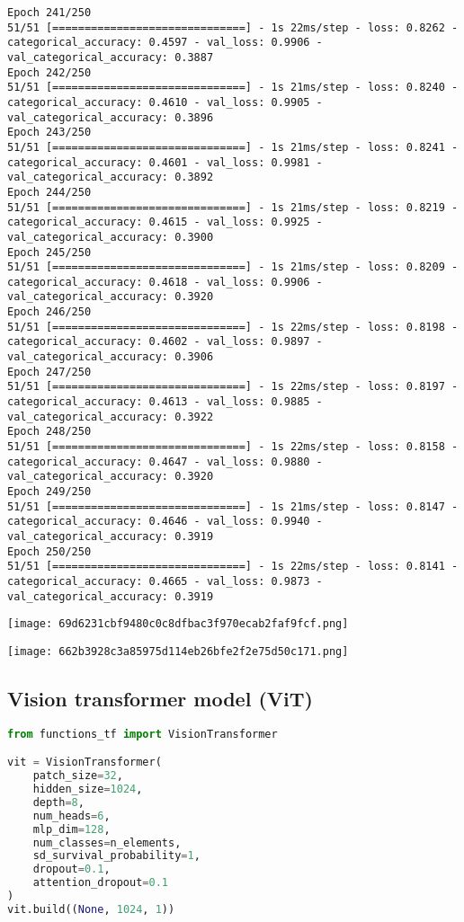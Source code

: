 \begin{lstlisting}
Epoch 241/250
51/51 [==============================] - 1s 22ms/step - loss: 0.8262 - categorical_accuracy: 0.4597 - val_loss: 0.9906 - val_categorical_accuracy: 0.3887
Epoch 242/250
51/51 [==============================] - 1s 21ms/step - loss: 0.8240 - categorical_accuracy: 0.4610 - val_loss: 0.9905 - val_categorical_accuracy: 0.3896
Epoch 243/250
51/51 [==============================] - 1s 21ms/step - loss: 0.8241 - categorical_accuracy: 0.4601 - val_loss: 0.9981 - val_categorical_accuracy: 0.3892
Epoch 244/250
51/51 [==============================] - 1s 21ms/step - loss: 0.8219 - categorical_accuracy: 0.4615 - val_loss: 0.9925 - val_categorical_accuracy: 0.3900
Epoch 245/250
51/51 [==============================] - 1s 21ms/step - loss: 0.8209 - categorical_accuracy: 0.4618 - val_loss: 0.9906 - val_categorical_accuracy: 0.3920
Epoch 246/250
51/51 [==============================] - 1s 22ms/step - loss: 0.8198 - categorical_accuracy: 0.4602 - val_loss: 0.9897 - val_categorical_accuracy: 0.3906
Epoch 247/250
51/51 [==============================] - 1s 22ms/step - loss: 0.8197 - categorical_accuracy: 0.4613 - val_loss: 0.9885 - val_categorical_accuracy: 0.3922
Epoch 248/250
51/51 [==============================] - 1s 22ms/step - loss: 0.8158 - categorical_accuracy: 0.4647 - val_loss: 0.9880 - val_categorical_accuracy: 0.3920
Epoch 249/250
51/51 [==============================] - 1s 21ms/step - loss: 0.8147 - categorical_accuracy: 0.4646 - val_loss: 0.9940 - val_categorical_accuracy: 0.3919
Epoch 250/250
51/51 [==============================] - 1s 22ms/step - loss: 0.8141 - categorical_accuracy: 0.4665 - val_loss: 0.9873 - val_categorical_accuracy: 0.3919
\end{lstlisting}

\texttt{[image: 69d6231cbf9480c0c8dfbac3f970ecab2faf9fcf.png]}

\texttt{[image: 662b3928c3a85975d114eb26bfe2f2e75d50c171.png]}

\hypertarget{vision-transformer-model-vit}{%
\subsection{Vision transformer model
(ViT)}\label{vision-transformer-model-vit}}

\begin{lstlisting}[language=Python]
from functions_tf import VisionTransformer

vit = VisionTransformer(
    patch_size=32,
    hidden_size=1024,
    depth=8,
    num_heads=6,
    mlp_dim=128,
    num_classes=n_elements,
    sd_survival_probability=1,
    dropout=0.1,
    attention_dropout=0.1
)
vit.build((None, 1024, 1))
\end{lstlisting}

